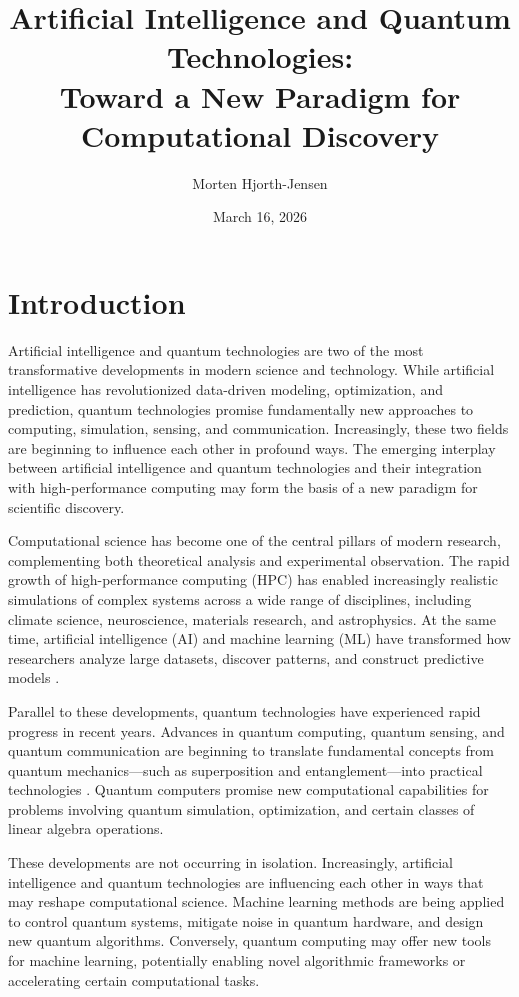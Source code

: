 \documentclass[11pt]{article}
\title{Artificial Intelligence and Quantum Technologies:\\
Toward a New Paradigm for Computational Discovery}
\author{Morten Hjorth-Jensen}
\date{March 16, 2026}
\begin{document}
\maketitle


\section{Introduction}

Artificial intelligence and quantum technologies are two of the most
transformative developments in modern science and technology. While
artificial intelligence has revolutionized data-driven modeling,
optimization, and prediction, quantum technologies promise
fundamentally new approaches to computing, simulation, sensing, and
communication. Increasingly, these two fields are beginning to
influence each other in profound ways. The emerging interplay between artificial intelligence and
quantum technologies and their integration with
high-performance computing may form the basis of a new paradigm for
scientific discovery. 

Computational science has become one of the central pillars of modern
research, complementing both theoretical analysis and experimental
observation. The rapid growth of high-performance computing (HPC) has
enabled increasingly realistic simulations of complex systems across a
wide range of disciplines, including climate science, neuroscience, materials
research, and astrophysics. At the same time,
artificial intelligence (AI) and machine learning (ML) have
transformed how researchers analyze large datasets, discover patterns,
and construct predictive models
\cite{goodfellow2016deep}.

Parallel to these developments, quantum technologies have experienced
rapid progress in recent years. Advances in quantum computing, quantum
sensing, and quantum communication are beginning to translate
fundamental concepts from quantum mechanics—such as superposition and
entanglement—into practical technologies
\cite{preskill2018quantum}. Quantum computers
promise new computational capabilities for problems involving quantum
simulation, optimization, and certain classes of linear algebra
operations.

These developments are not occurring in isolation. Increasingly,
artificial intelligence and quantum technologies are influencing each
other in ways that may reshape computational science. Machine learning
methods are being applied to control quantum systems, mitigate noise
in quantum hardware, and design new quantum algorithms. Conversely,
quantum computing may offer new tools for machine learning,
potentially enabling novel algorithmic frameworks or accelerating
certain computational tasks.
\end{document}
